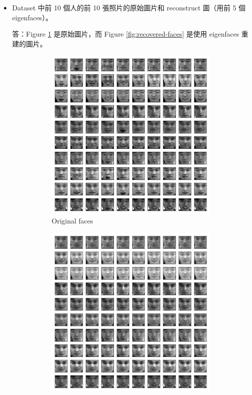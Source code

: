 \documentclass[12pt,a4paper]{extarticle}
\begin{document}
\begin{itemize}
  \item[1.2] Dataset 中前 10 個人的前 10 張照片的原始圖片和 reconstruct 圖（用前 5 個 eigenfaces）。
  \par 答：Figure \ref{fig:original-faces} 是原始圖片，而 Figure \ref{fig:recovered-faces} 是使用 eigenfaces 重建的圖片。

  \begin{figure}[ht]
    \begin{subfigure}[t]{0.5\textwidth}
      \centering
      \includegraphics[width=\linewidth]{origin-faces-first-100.png}
      \caption{Original faces}
      \label{fig:original-faces}
    \end{subfigure}
    \begin{subfigure}[t]{0.5\textwidth}
      \centering
      \includegraphics[width=\linewidth]{reconstruct-with-5-eigenfaces.png}

\end{subfigure}
\end{figure}
\end{itemize}
\end{document}
